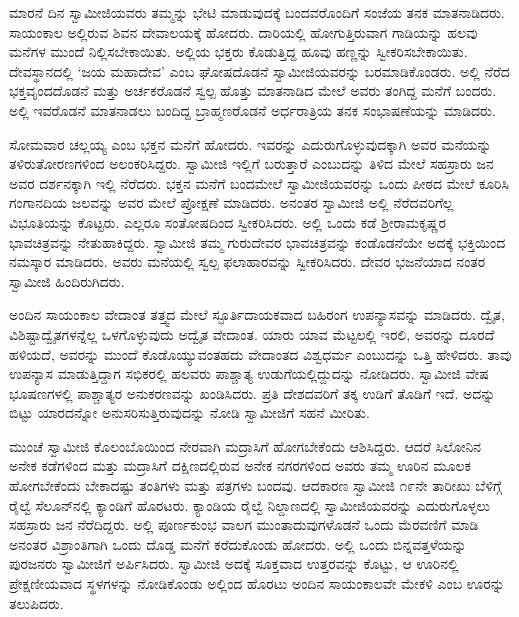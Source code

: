 \vskip 3pt

 ಮಾರನೆ ದಿನ ಸ್ವಾಮೀಜಿಯವರು ತಮ್ಮನ್ನು ಭೇಟಿ ಮಾಡುವುದಕ್ಕೆ ಬಂದವರೊಂದಿಗೆ ಸಂಜೆಯ ತನಕ ಮಾತನಾಡಿದರು. ಸಾಯಂಕಾಲ ಅಲ್ಲಿರುವ ಶಿವನ ದೇವಾಲಯಕ್ಕೆ ಹೋದರು. ದಾರಿಯಲ್ಲಿ ಹೋಗುತ್ತಿರುವಾಗ ಗಾಡಿಯನ್ನು ಹಲವು ಮನೆಗಳ ಮುಂದೆ ನಿಲ್ಲಿಸಬೇಕಾಯಿತು. ಅಲ್ಲಿಯ ಭಕ್ತರು ಕೊಡುತ್ತಿದ್ದ ಹೂವು ಹಣ್ಣನ್ನು ಸ್ವೀಕರಿಸಬೇಕಾಯಿತು. ದೇವಸ್ಥಾನದಲ್ಲಿ ‘ಜಯ ಮಹಾದೇವ’ ಎಂಬ ಘೋಷದೊಡನೆ ಸ್ವಾಮೀಜಿಯವರನ್ನು ಬರಮಾಡಿಕೊಂಡರು. ಅಲ್ಲಿ ನೆರೆದ ಭಕ್ತವೃಂದದೊಡನೆ ಮತ್ತು ಅರ್ಚಕರೊಡನೆ ಸ್ವಲ್ಪ ಹೊತ್ತು ಮಾತನಾಡಿದ ಮೇಲೆ ಅವರು ತಂಗಿದ್ದ ಮನೆಗೆ ಬಂದರು. ಅಲ್ಲಿ ಇವರೊಡನೆ ಮಾತನಾಡಲು ಬಂದಿದ್ದ ಬ್ರಾಹ್ಮಣರೊಡನೆ ಅರ್ಧರಾತ್ರಿಯ ತನಕ ಸಂಭಾಷಣೆಯನ್ನು ಮಾಡಿದರು. 

\vskip 3pt

 ಸೋಮವಾರ ಚಲ್ಲಯ್ಯ ಎಂಬ ಭಕ್ತನ ಮನೆಗೆ ಹೋದರು. ಇವರನ್ನು ಎದುರುಗೊಳ್ಳುವುದಕ್ಕಾಗಿ ಅವರ ಮನೆಯನ್ನು ತಳಿರುತೋರಣಗಳಿಂದ ಅಲಂಕರಿಸಿದ್ದರು. ಸ್ವಾಮೀಜಿ ಇಲ್ಲಿಗೆ ಬರುತ್ತಾರೆ ಎಂಬುದನ್ನು ತಿಳಿದ ಮೇಲೆ ಸಹಸ್ರಾರು ಜನ ಅವರ ದರ್ಶನಕ್ಕಾಗಿ ಇಲ್ಲಿ ನೆರೆದರು. ಭಕ್ತನ ಮನೆಗೆ ಬಂದಮೇಲೆ ಸ್ವಾಮೀಜಿಯವರನ್ನು ಒಂದು ಪೀಠದ ಮೇಲೆ ಕೂರಿಸಿ ಗಂಗಾನದಿಯ ಜಲವನ್ನು ಅವರ ಮೇಲೆ ಪ್ರೋಕ್ಷಣೆ ಮಾಡಿದರು. ಅನಂತರ ಸ್ವಾಮೀಜಿ ಅಲ್ಲಿ ನೆರೆದವರಿಗೆಲ್ಲ ವಿಭೂತಿಯನ್ನು ಕೊಟ್ಟರು. ಎಲ್ಲರೂ ಸಂತೋಷದಿಂದ ಸ್ವೀಕರಿಸಿದರು. ಅಲ್ಲಿ ಒಂದು ಕಡೆ ಶ‍್ರೀರಾಮಕೃಷ್ಣರ ಭಾವಚಿತ್ರವನ್ನು ನೇತುಹಾಕಿದ್ದರು. ಸ್ವಾಮೀಜಿ ತಮ್ಮ ಗುರುದೇವರ ಭಾವಚಿತ್ರವನ್ನು ಕಂಡೊಡನೆಯೇ ಅದಕ್ಕೆ ಭಕ್ತಿಯಿಂದ ನಮಸ್ಕಾರ ಮಾಡಿದರು. ಅವರು ಮನೆಯಲ್ಲಿ ಸ್ವಲ್ಪ ಫಲಾಹಾರವನ್ನು ಸ್ವೀಕರಿಸಿದರು. ದೇವರ ಭಜನೆಯಾದ ನಂತರ ಸ್ವಾಮೀಜಿ ಹಿಂದಿರುಗಿದರು. 

\vskip 3pt

 ಅಂದಿನ ಸಾಯಂಕಾಲ ವೇದಾಂತ ತತ್ತ್ವದ ಮೇಲೆ ಸ್ಫೂರ್ತಿದಾಯಕವಾದ ಬಹಿರಂಗ ಉಪನ್ಯಾಸವನ್ನು ಮಾಡಿದರು. ದ್ವೈತ, ವಿಶಿಷ್ಟಾದ್ವೈತಗಳನ್ನೆಲ್ಲ ಒಳಗೊಳ್ಳುವುದು ಅದ್ವೈತ ವೇದಾಂತ. ಯಾರು ಯಾವ ಮೆಟ್ಟಲಲ್ಲಿ ಇರಲಿ, ಅವರನ್ನು ದೂರದೆ ಹಳಿಯದೆ, ಅವರನ್ನು ಮುಂದೆ ಕೊಡೊಯ್ಯುವಂತಹದು ವೇದಾಂತದ ವಿಶ್ವಧರ್ಮ ಎಂಬುದನ್ನು ಒತ್ತಿ ಹೇಳಿದರು. ತಾವು ಉಪನ್ಯಾಸ ಮಾಡುತ್ತಿದ್ದಾಗ ಸಭಿಕರಲ್ಲಿ ಹಲವರು ಪಾಶ್ಚಾತ್ಯ ಉಡುಗೆಯಲ್ಲಿದ್ದುದನ್ನು ನೋಡಿದರು. ಸ್ವಾಮೀಜಿ ವೇಷ ಭೂಷಣಗಳಲ್ಲಿ ಪಾಶ್ಚಾತ್ಯರ ಅನುಕರಣವನ್ನು ಖಂಡಿಸಿದರು. ಪ್ರತಿ ದೇಶದವರಿಗೆ ತಕ್ಕ ಉಡಿಗೆ ತೊಡಿಗೆ ಇದೆ. ಅದನ್ನು ಬಿಟ್ಟು ಯಾರದನ್ನೋ ಅನುಸರಿಸುತ್ತಿರುವುದನ್ನು ನೋಡಿ ಸ್ವಾಮೀಜಿಗೆ ಸಹನೆ ಮೀರಿತು. 

\vskip 3pt

 ಮುಂಚೆ ಸ್ವಾಮೀಜಿ ಕೊಲಂಬೊಯಿಂದ ನೇರವಾಗಿ ಮದ್ರಾಸಿಗೆ ಹೋಗಬೇಕೆಂದು ಆಶಿಸಿದ್ದರು. ಆದರೆ ಸಿಲೋನಿನ ಅನೇಕ ಕಡೆಗಳಿಂದ ಮತ್ತು ಮದ್ರಾಸಿಗೆ ದಕ್ಷಿಣದಲ್ಲಿರುವ ಅನೇಕ ನಗರಗಳಿಂದ ಅವರು ತಮ್ಮ ಊರಿನ ಮೂಲಕ ಹೋಗಬೇಕೆಂದು ಬೇಕಾದಷ್ಟು ತಂತಿಗಳು ಮತ್ತು ಪತ್ರಗಳು ಬಂದವು. ಆದಕಾರಣ ಸ್ವಾಮೀಜಿ ೧೯ನೇ ತಾರೀಖು ಬೆಳಿಗ್ಗೆ ರೈಲ್ವೆ ಸೆಲೂನ್‍ನಲ್ಲಿ ಕ್ಯಾಂಡಿಗೆ ಹೊರಟರು. ಕ್ಯಾಂಡಿಯ ರೈಲ್ವೆ ನಿಲ್ದಾಣದಲ್ಲಿ ಸ್ವಾಮೀಜಿಯವರನ್ನು ಎದುರುಗೊಳ್ಳಲು ಸಹಸ್ರಾರು ಜನ ನೆರೆದಿದ್ದರು. ಅಲ್ಲಿ ಪೂರ್ಣಕುಂಭ ವಾಲಗ ಮುಂತಾದುವುಗಳೊಡನೆ ಒಂದು ಮೆರವಣಿಗೆ ಮಾಡಿ ಅನಂತರ ವಿಶ್ರಾಂತಿಗಾಗಿ ಒಂದು ದೊಡ್ಡ ಮನೆಗೆ ಕರೆದುಕೊಂಡು ಹೋದರು. ಅಲ್ಲಿ ಒಂದು ಬಿನ್ನವತ್ತಳೆಯನ್ನು ಪುರಜನರು ಸ್ವಾಮೀಜಿಗೆ ಅರ್ಪಿಸಿದರು. ಸ್ವಾಮೀಜಿ ಅದಕ್ಕೆ ಸೂಕ್ತವಾದ ಉತ್ತರವನ್ನು ಕೊಟ್ಟು, ಆ ಊರಿನಲ್ಲಿ ಪ್ರೇಕ್ಷಣೀಯವಾದ ಸ್ಥಳಗಳನ್ನು ನೋಡಿಕೊಂಡು ಅಲ್ಲಿಂದ ಹೊರಟು ಅಂದಿನ ಸಾಯಂಕಾಲವೇ ಮೇಕಳಿ ಎಂಬ ಊರನ್ನು ತಲುಪಿದರು. 

